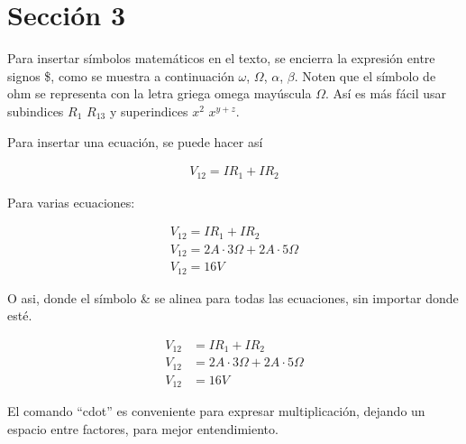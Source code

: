 \documentclass[12pt]{article}
\begin{document}
\section{Sección 3}

Para insertar símbolos matemáticos en el texto, se encierra la expresión entre signos \$, como se muestra a continuación $\omega$, $\Omega$, $\alpha$, $\beta$. Noten que el símbolo de ohm se representa con la letra griega omega mayúscula $\Omega$. Así es más fácil usar subindices $R_1$ $R_{13}$ y superindices $x^2$ $x^{y+z}$.

Para insertar una ecuación, se puede hacer así

\begin{align}
    V_{12} = I R_1 + I R_2
\end{align}

Para varias ecuaciones:

\begin{align}
    V_{12} = I R_1 + I R_2\\
    V_{12} = 2A \cdot 3\Omega + 2A \cdot 5\Omega\\
    V_{12} = 16V
\end{align}

O asi, donde el símbolo \& se alinea para todas las ecuaciones, sin importar donde esté.

\begin{align}
    V_{12} & = I R_1 + I R_2\\
    V_{12} & = 2A \cdot 3\Omega + 2A \cdot 5\Omega\\
    V_{12} & = 16V
\end{align}

El comando ``cdot'' es conveniente para expresar multiplicación, dejando un espacio entre factores, para mejor entendimiento.
\end{document}
